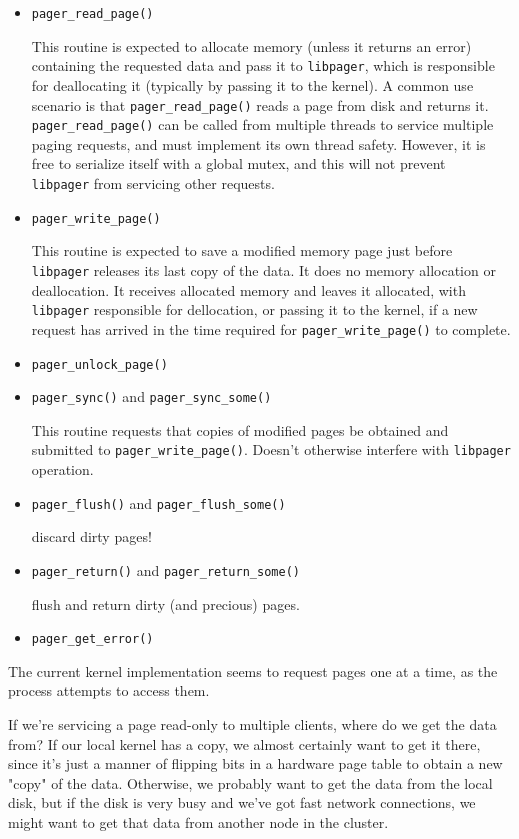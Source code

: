 \documentclass{article}
\def\libpager{{\tt libpager}\xspace}
\begin{document}
\begin{itemize}

\item {\tt pager_read_page()}

This routine is expected to allocate memory (unless it returns an
error) containing the requested data and pass it to \libpager, which
is responsible for deallocating it (typically by passing it to the
kernel).  A common use scenario is that {\tt pager_read_page()} reads
a page from disk and returns it.  {\tt pager_read_page()} can be
called from multiple threads to service multiple paging requests, and
must implement its own thread safety.  However, it is free to
serialize itself with a global mutex, and this will not prevent {\tt
  libpager} from servicing other requests.

\item {\tt pager_write_page()}

This routine is expected to save a modified memory page just before
\libpager releases its last copy of the data.  It does no memory
allocation or deallocation.  It receives allocated memory and leaves
it allocated, with \libpager responsible for dellocation, or passing
it to the kernel, if a new request has arrived in the time required
for {\tt pager_write_page()} to complete.

\item {\tt pager_unlock_page()}

\item {\tt pager_sync()} and {\tt pager_sync_some()}

This routine requests that copies of modified pages be obtained
and submitted to {\tt pager_write_page()}.  Doesn't otherwise
interfere with \libpager operation.

\item {\tt pager_flush()} and {\tt pager_flush_some()}

discard dirty pages!

\item {\tt pager_return()} and {\tt pager_return_some()}

 flush and return dirty (and precious) pages.

\item {\tt pager_get_error()}

\end{itemize}

The current kernel implementation seems to request pages one at
a time, as the process attempts to access them.

If we're servicing a page read-only to multiple clients, where do we
get the data from?  If our local kernel has a copy, we almost
certainly want to get it there, since it's just a manner of flipping
bits in a hardware page table to obtain a new "copy" of the data.
Otherwise, we probably want to get the data from the local disk, but
if the disk is very busy and we've got fast network connections, we
might want to get that data from another node in the cluster.
\end{document}
